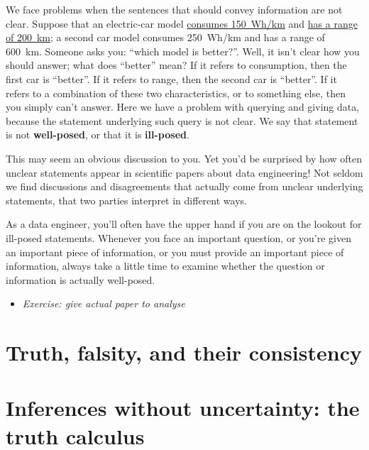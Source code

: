 \documentclass[]{book}
\providecommand{\tightlist}{%
  \setlength{\itemsep}{0pt}\setlength{\parskip}{0pt}}
\begin{document}
We face problems when the sentences that should convey information are not clear. Suppose that an electric-car model \href{https://ev-database.org/cheatsheet/energy-consumption-electric-car}{consumes 150~Wh/km} and \href{https://ev-database.org/cheatsheet/range-electric-car}{has a range of 200~km}; a second car model consumes 250~Wh/km and has a range of 600~km. Someone asks you: ``which model is better?''. Well, it isn't clear how you should answer; what does ``better'' mean? If it refers to consumption, then the first car is ``better''. If it refers to range, then the second car is ``better''. If it refers to a combination of these two characteristics, or to something else, then you simply can't answer. Here we have a problem with querying and giving data, because the statement underlying such query is not clear. We say that statement is not \textbf{well-posed}, or that it is \textbf{ill-posed}.

This may seem an obvious discussion to you. Yet you'd be surprised by how often unclear statements appear in scientific papers about data engineering! Not seldom we find discussions and disagreements that actually come from unclear underlying statements, that two parties interpret in different ways.

As a data engineer, you'll often have the upper hand if you are on the lookout for ill-posed statements. Whenever you face an important question, or you're given an important piece of information, or you must provide an important piece of information, always take a little time to examine whether the question or information is actually well-posed.

\begin{itemize}
\tightlist
\item
  \emph{Exercise: give actual paper to analyse}
\end{itemize}

\hypertarget{truth-falsity-and-their-consistency}{%
\section{Truth, falsity, and their consistency}\label{truth-falsity-and-their-consistency}}

\hypertarget{inferences-without-uncertainty-the-truth-calculus}{%
\section{Inferences without uncertainty: the truth calculus}\label{inferences-without-uncertainty-the-truth-calculus}}
\end{document}
